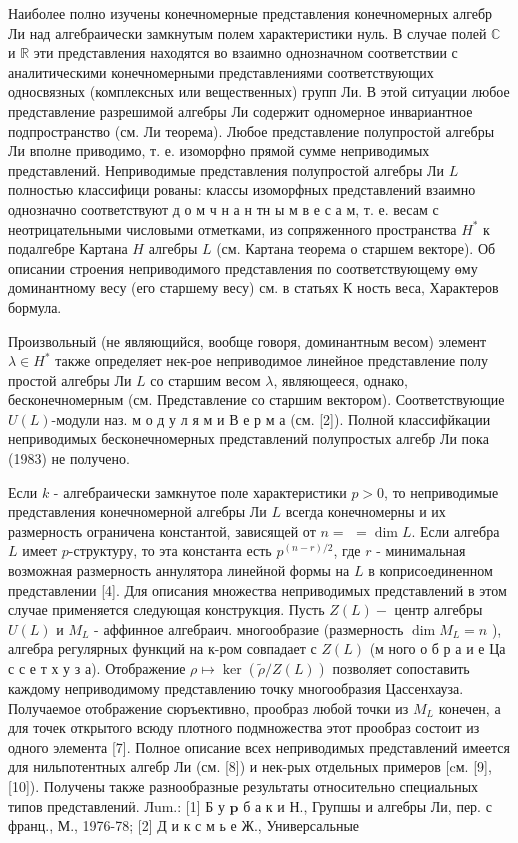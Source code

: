 \documentclass[10pt]{article}
\begin{document}
Наиболее полно изучены конечномерные представления конечномерных алгебр Ли над алгебраически замкнутым полем характеристики нуль. В случае полей $\mathbb{C}$ и $\mathbb{R}$ эти представления находятся во взаимно однозначном соответствии с аналитическими конечномерными представлениями соответствующих односвязных (комплексных или вещественных) групп Ли. В этой ситуации любое представление разрешимой алгебры Ли содержит одномерное инвариантное подпространство (см. Ли теорема). Любое представление полупростой алгебры Ли вполне приводимо, т. е. изоморфно прямой сумме неприводимых представлений. Неприводимые представления полупростой алгебры Ли $L$ полностью классифици рованы: классы изоморфных представлений взаимно однозначно соответствуют д о м ч н а н тн ы м в е с а м, т. е. весам с неотрицательными числовыми отметками, из сопряженного пространства $H^{*}$ к подалгебре Картана $H$ алгебры $L$ (см. Картана теорема о старшем векторе). Об описании строения неприводимого представления по соответствующему өму доминантному весу (его старшему весу) см. в статьях К ность веса, Характеров бормула.



Произвольный (не являющийся, вообще говоря, доминантным весом) элемент $\lambda \in H^{*}$ также определяет нек-рое неприводимое линейное представление полу простой алгебры Ли $L$ со старшим весом $\lambda$, являющееся, однако, бесконечномерным (см. Представление со старшим вектором). Соответствующие $U(L)$-модули наз. м о д у л я м и В е р м а (см. [2]). Полной классифйкации неприводимых бесконечномерных представлений полупростых алгебр Ли пока (1983) не получено.



Если $k$ - алгебраически замкнутое поле характеристики $p>0$, то неприводимые представления конечномерной алгебры Ли $L$ всегда конечномерны и их размерность ограничена константой, зависящей от $n=$ $=\operatorname{dim} L$. Если алгебра $L$ имеет $p$-структуру, то эта константа есть $p^{(n-r) / 2}$, где $r$ - минимальная возможная размерность аннулятора линейной формы на $L$ в коприсоединенном представлении [4]. Для описания множества неприводимых представлений в этом случае применяется следующая конструкция. Пусть $Z(L)-$ центр алгебры $U(L)$ и $M_{L}$ - аффинное алгебраич. многообразие (размерность $\operatorname{dim} M_{L}=n$ ), алгебра регулярных функций на к-ром совпадает с $Z(L)$ (м ного о б р а и е Ца с с е т х у з а). Отображение $\rho \mapsto \operatorname{ker}(\tilde{\rho} / Z(L))$ позволяет сопоставить каждому неприводимому представлению точку многообразия Цассенхауза. Получаемое отображение сюръективно, прообраз любой точки из $M_{L}$ конечен, а для точек открытого всюду плотного подмножества этот прообраз состоит из одного элемента [7]. Полное описание всех неприводимых представлений имеется для нильпотентных алгебр Ли (см. [8]) и нек-рых отдельных примеров [cм. [9], [10]). Получены также разнообразные результаты относительно специальных типов представлениӥ. Лum.: [1] Б у $\mathbf{p}$ б а к и Н., Групшы и алгебры Ли, пер. с франц., М., 1976-78; [2] Д и к с м ь е Ж., Универсальные
\end{document}
